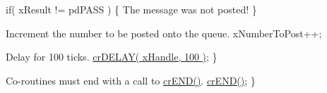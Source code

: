 \begin{DoxyPre}        if( xResult != pdPASS )
        \{
The message was not posted!
        \}\end{DoxyPre}



\begin{DoxyPre}Increment the number to be posted onto the queue.
        xNumberToPost++;\end{DoxyPre}



\begin{DoxyPre}Delay for 100 ticks.
        \hyperlink{croutine_8h_a05a06feb11028f2d1d440ea335f562ba}{crDELAY( xHandle, 100 )};
    \}\end{DoxyPre}



\begin{DoxyPre}Co-routines must end with a call to \hyperlink{croutine_8h_ae6038cc976689b50000475ebfc4e2f23}{crEND()}.
    \hyperlink{croutine_8h_ae6038cc976689b50000475ebfc4e2f23}{crEND()};
 \}\end{DoxyPre}
 